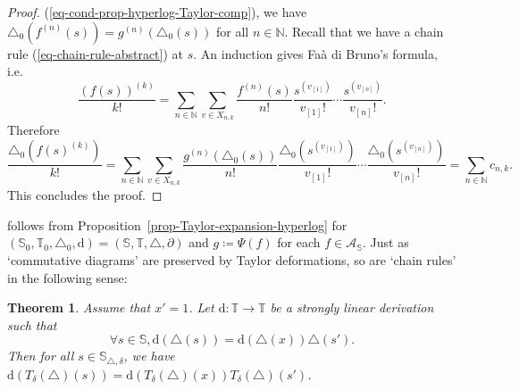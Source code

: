 \documentclass{article}
\newcommand{\assign}{\coloneqq}
\newcommand{\mathd}{\mathrm{d}}
\newcommand{\of}{:}
\newtheorem{theorem}{Theorem}[section]
\theoremstyle{remark}\newtheorem*{convention*}{Convention}
\begin{document}
\begin{proof}
  (\ref{eq-cond-prop-hyperlog-Taylor-comp}), we have $\triangle_0 (f^{(n)}
  (s)) = g^{(n)} (\triangle_0 (s))$ for all $n \in \mathbb{N}$. Recall that we
  have a chain rule (\ref{eq-chain-rule-abstract}) at $s$. An induction gives
  Fa{\`a} di Bruno's formula, i.e.
  \[ \frac{(f (s))^{(k)}}{k!} = \sum_{n \in \mathbb{N}} \sum_{v \in X_{n, k}}
     \frac{f^{(n)} (s)}{n!}  \frac{s^{(v_{[1]})}}{v_{[1]} !} \cdots
     \frac{s^{(v_{[n]})}}{v_{[n]} !} . \]
  Therefore
  \[ \frac{\triangle_0 (f (s)^{(k)})}{k!} = \sum_{n \in \mathbb{N}} \sum_{v
     \in X_{n, k}} \frac{g^{(n)} (\triangle_0 (s))}{n!}  \frac{\triangle_0
     (s^{(v_{[1]})})}{v_{[1]} !} \cdots \frac{\triangle_0
     (s^{(v_{[n]})})}{v_{[n]} !} = \sum_{n \in \mathbb{N}} c_{n, k} . \]
  This concludes the proof.
\end{proof}

 follows from Proposition~\ref{prop-Taylor-expansion-hyperlog}
for $(\mathbb{S}_0, \mathbb{T}_0, \triangle_0, \mathd) = (\mathbb{S},
\mathbb{T}, \triangle, \partial)$ and $g \assign \Psi (f)$ for each $f \in
\mathcal{A}_{\mathbb{S}}$. Just as `commutative diagrams' are preserved by
Taylor deformations, so are `chain rules' in the following sense:

\begin{theorem}
  \label{th-chain-rule}Assume that $x' = 1$. Let $\mathd \of \mathbb{T}
  \longrightarrow \mathbb{T}$ be a strongly linear derivation such that
  \[ \forall s \in \mathbb{S}, \mathd (\triangle (s)) = \mathd (\triangle (x))
     \triangle (s') . \]
  Then for all $s \in \mathbb{S}_{\triangle, \delta}$, we have $\mathd
  (T_{\delta} (\triangle) (s)) = \mathd (T_{\delta} (\triangle) (x))
  T_{\delta} (\triangle) (s')$.
\end{theorem}
\end{document}
